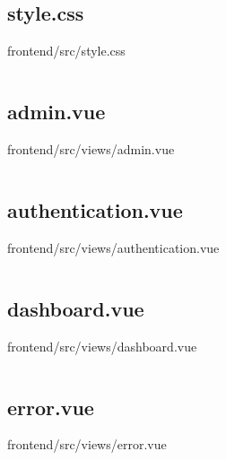 \inputminted[linenos,breaklines,tabsize=2]{javascript}{/Users/Henry/Desktop/NEAComputerScience/frontend/src/stores/useUserStore.js}

\makeatletter
\subsection*{style.css}
frontend/src/style.css
\def\@currentlabelname{style.css}
\label{code:frontend:src:style.css}
\makeatother

\inputminted[linenos,breaklines,tabsize=2]{css}{/Users/Henry/Desktop/NEAComputerScience/frontend/src/style.css}

\makeatletter
\subsection*{admin.vue}
frontend/src/views/admin.vue
\def\@currentlabelname{admin.vue}
\label{code:frontend:src:views:admin.vue}
\makeatother

\inputminted[linenos,breaklines,tabsize=2]{vue}{/Users/Henry/Desktop/NEAComputerScience/frontend/src/views/admin.vue}

\makeatletter
\subsection*{authentication.vue}
frontend/src/views/authentication.vue
\def\@currentlabelname{authentication.vue}
\label{code:frontend:src:views:authentication.vue}
\makeatother

\inputminted[linenos,breaklines,tabsize=2]{vue}{/Users/Henry/Desktop/NEAComputerScience/frontend/src/views/authentication.vue}

\makeatletter
\subsection*{dashboard.vue}
frontend/src/views/dashboard.vue
\def\@currentlabelname{dashboard.vue}
\label{code:frontend:src:views:dashboard.vue}
\makeatother

\inputminted[linenos,breaklines,tabsize=2]{vue}{/Users/Henry/Desktop/NEAComputerScience/frontend/src/views/dashboard.vue}

\makeatletter
\subsection*{error.vue}
frontend/src/views/error.vue
\def\@currentlabelname{error.vue}
\label{code:frontend:src:views:error.vue}
\makeatother

